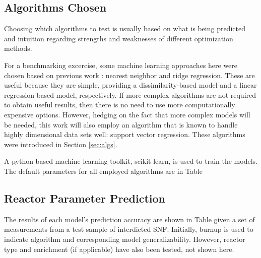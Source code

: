 \subsection{Algorithms Chosen}
\label{sec:choice}

Choosing which algorithms to test is usually based on what is being predicted
and intuition regarding strengths and weaknesses of different optimization
methods.  

For a benchmarking excercise, some machine learning approaches here were chosen
based on previous work \cite{dayman_feasibility_2013}: nearest neighbor and
ridge regression. These are useful because they are simple, providing a
dissimilarity-based model and a linear regression-based model, respectively. If
more complex algorithms are not required to obtain useful results, then there
is no need to use more computationally expensive options. However, hedging on
the fact that more complex models will be needed, this work will also employ an
algorithm that is known to handle highly dimensional data sets well: support
vector regression. These algorithms were introduced in Section \ref{sec:algs}. 

A python-based machine learning toolkit, scikit-learn,  is used to 
train the models. The default parameters for all employed algorithms are in Table %


\subsection{Reactor Parameter Prediction}
\label{sec:rxtrparam}

The results of each model's prediction accuracy are shown in Table
given a set of measurements from a test sample of interdicted \gls{SNF}.
Initially, burnup is used to indicate algorithm and corresponding model
generalizability.  However, reactor type and enrichment (if applicable) have
also been tested, not shown here.  

